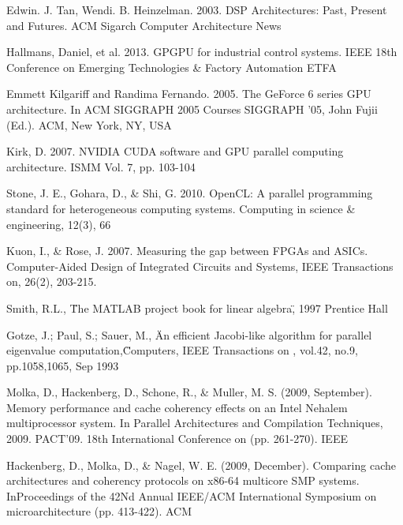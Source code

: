 \newpage
\pagestyle{plain}


\begin{thebibliography}{99}

 Edwin. J. Tan, Wendi. B. Heinzelman. 2003. DSP Architectures: Past, Present and Futures. ACM Sigarch Computer Architecture News

 Hallmans, Daniel, et al. 2013. GPGPU for industrial control systems. IEEE 18th Conference on Emerging Technologies \& Factory Automation ETFA

 Emmett Kilgariff and Randima Fernando. 2005. The GeForce 6 series GPU architecture. In ACM SIGGRAPH 2005 Courses SIGGRAPH '05, John Fujii (Ed.). ACM, New York, NY, USA

 Kirk, D. 2007. NVIDIA CUDA software and GPU parallel computing architecture. ISMM Vol. 7, pp. 103-104

 Stone, J. E., Gohara, D., \& Shi, G. 2010. OpenCL: A parallel programming standard for heterogeneous computing systems. Computing in science \& engineering, 12(3), 66

 Kuon, I., \& Rose, J. 2007. Measuring the gap between FPGAs and ASICs. Computer-Aided Design of Integrated Circuits and Systems, IEEE Transactions on, 26(2), 203-215.

Smith, R.L., \"The MATLAB project book for linear algebra\", 1997 Prentice Hall

 Gotze, J.; Paul, S.; Sauer, M., \"An efficient Jacobi-like algorithm for parallel eigenvalue computation,\" Computers, IEEE Transactions on , vol.42, no.9, pp.1058,1065, Sep 1993

 Molka, D., Hackenberg, D., Schone, R., \& Muller, M. S. (2009, September). Memory performance and cache coherency effects on an Intel Nehalem multiprocessor system. In Parallel Architectures and Compilation Techniques, 2009. PACT'09. 18th International Conference on (pp. 261-270). IEEE

 Hackenberg, D., Molka, D., \& Nagel, W. E. (2009, December). Comparing cache architectures and coherency protocols on x86-64 multicore SMP systems. InProceedings of the 42Nd Annual IEEE/ACM International Symposium on microarchitecture (pp. 413-422). ACM

\end{thebibliography}